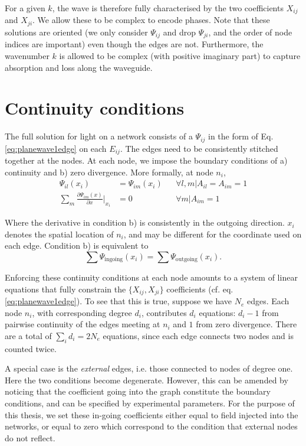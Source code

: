 For a given $k$, the wave is therefore fully characterised by the two coefficients $X_{ij}$ and $X_{ji}$. We allow these to be complex to encode phases. Note that these solutions are oriented (we only consider $\Psi_{ij}$ and drop $\Psi_{ji}$, and the order of node indices are important) even though the edges are not. Furthermore, the wavenumber $k$ is allowed to be complex (with positive imaginary part) to capture absorption and loss along the waveguide.


\section{Continuity conditions}
The full solution for light on a network consists of a $\Psi_{ij}$ in the form of Eq.\ref{eq:planewave1edge} on each $E_{ij}$. The edges need to be consistently stitched together at the nodes. At each node, we impose the boundary conditions of a) continuity and b) zero divergence. More formally, at node $n_i$,
\begin{subequations}
\begin{align}
\label{eq:cont.cond}
        \Psi_{il} (x_i) &= \Psi_{im}(x_i) &&\forall l,m \rvert A_{il}=A_{im}=1\\
        \sum_m \frac{\partial\Psi_{im}(x)}{\partial x}\Big\rvert_{x_i} &= 0 &&\forall m \rvert A_{im}=1 
\end{align}
\end{subequations}

Where the derivative in condition b) is consistently in the outgoing direction. $x_i$ denotes the spatial location of $n_i$, and may be different for the coordinate used on each edge. Condition b) is equivalent to 
\begin{equation}
    \label{eq:in=out}
    \sum \Psi_{\textrm{ingoing}} (x_i) = \sum \Psi_{\textrm{outgoing}} (x_i).
\end{equation}

Enforcing these continuity conditions at each node amounts to a system of linear equations that fully constrain the $\{X_{ij},X_{ji}\}$ coefficients (cf. eq.\ref{eq:planewave1edge}). To see that this is true, suppose we have $N_e$ edges. Each node $n_i$, with corresponding degree $d_i$, contributes $d_i$ equations: $d_i - 1$ from pairwise continuity of the edges meeting at $n_i$ and $1$ from zero divergence. There are a total of $\sum_i{d_i} = 2N_e$ equations, since each edge connects two nodes and is counted twice.

A special case is the \textit{external} edges, i.e. those connected to nodes of degree one. Here the two conditions become degenerate. However, this can be amended by noticing that the coefficient going into the graph constitute the boundary conditions, and can be specified by experimental parameters. For the purpose of this thesis, we set these in-going coefficients either equal to field injected into the networks, or equal to zero which correspond to the condition that external nodes do not reflect.

